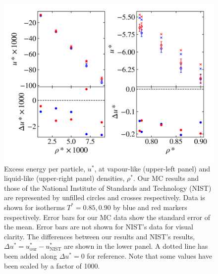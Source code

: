 \documentclass[10pt, twocolumn]{revtex4}    %
\begin{document}


\begin{figure}
	\includegraphics[width=\linewidth]{figures/NIST_comparison/NIST_u.png}
	\caption{Excess energy per particle, $u^{*}$, at vapour-like (upper-left panel) and liquid-like (upper-right panel) densities, $\rho{}^{*}$. Our MC results and those of the National Institute of Standards and Technology (NIST) are represented by unfilled circles and crosses respectively. Data is shown for isotherms $T^{*}=0.85, 0.90$ by blue and red markers respectively. Error bars for our MC data show the standard error of the mean. Error bars are not shown for NIST's data for visual clarity. The differences between our results and NIST's results, $\Delta{}u^{*} = u_\text{our}^{*} - u_\text{NIST}^{*}$ are shown in the lower panel. A dotted line has been added along $\Delta{}u^{*}=0$ for reference. Note that some values have been scaled by a factor of 1000.}
	\label{fig:NIST_u}
\end{figure}
\end{document}
